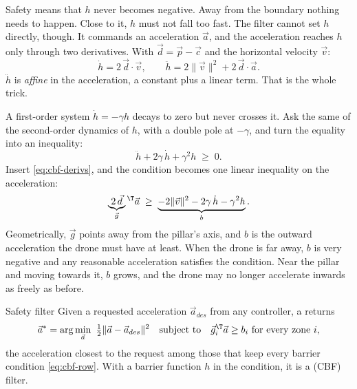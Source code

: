 Safety means that $h$ never becomes negative. Away from the boundary nothing needs to happen. Close to it, $h$ must not fall too fast. The filter cannot set $h$ directly, though. It commands an acceleration $\vec a$, and the acceleration reaches $h$ only through two derivatives. With $\vec d = \vec p - \vec c$ and the horizontal velocity $\vec v$:
\begin{equation}\label{eq:cbf-derivs}
  \dot h = 2\,\vec d\cdot\vec v, \qquad \ddot h = 2\|\vec v\|^2 + 2\,\vec d\cdot\vec a .
\end{equation}
$\ddot h$ is \emph{affine} in the acceleration, a constant plus a linear term. That is the whole trick.

A first-order system $\dot h = -\gamma h$ decays to zero but never crosses it. Ask the same of the second-order dynamics of $h$, with a double pole at $-\gamma$, and turn the equality into an inequality:
\begin{equation}\label{eq:cbf-cond}
  \ddot h + 2\gamma\,\dot h + \gamma^2 h \;\ge\; 0 .
\end{equation}
Insert \cref{eq:cbf-derivs}, and the condition becomes one linear inequality on the acceleration:
\begin{equation}\label{eq:cbf-row}
  \underbrace{2\,\vec d}_{\vec g}{}^{\T}\vec a \;\ge\; \underbrace{-2\|\vec v\|^2 - 2\gamma\,\dot h - \gamma^2 h}_{b} .
\end{equation}
Geometrically, $\vec g$ points away from the pillar's axis, and $b$ is the outward acceleration the drone must have at least. When the drone is far away, $b$ is very negative and any reasonable acceleration satisfies the condition. Near the pillar and moving towards it, $b$ grows, and the drone may no longer accelerate inwards as freely as before.

\begin{definition}{Safety filter}
Given a requested acceleration $\vec a_{des}$ from any controller, a  returns
\begin{equation}\label{eq:cbf-qp}
  \vec a^* = \arg\min_{\vec a}\ \tfrac12\|\vec a - \vec a_{des}\|^2 \quad\text{subject to}\quad \vec g_i^{\T}\vec a \ge b_i \ \text{for every zone } i,
\end{equation}
the acceleration closest to the request among those that keep every barrier condition \cref{eq:cbf-row}. With a barrier function $h$ in the condition, it is a  (CBF) filter.
\end{definition}

